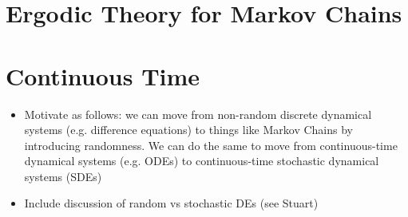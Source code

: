 \documentclass[12pt]{article}
\begin{document}
\section{Ergodic Theory for Markov Chains}




\section{Continuous Time}
\begin{itemize}
\item Motivate as follows: we can move from non-random discrete dynamical systems (e.g. difference equations) to things like Markov Chains by introducing randomness. We can do the 
same to move from continuous-time dynamical systems (e.g. ODEs) to continuous-time stochastic dynamical systems (SDEs) 
\item Include discussion of random vs stochastic DEs (see Stuart)
\end{itemize}
\end{document}
